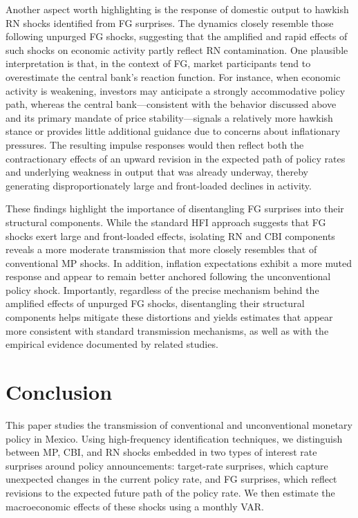 \documentclass[12pt, reqno]{article}
\begin{document}
Another aspect worth highlighting is the response of domestic output to hawkish RN shocks identified from FG surprises. The dynamics closely resemble those following unpurged FG shocks, suggesting that the amplified and rapid effects of such shocks on economic activity partly reflect RN contamination. One plausible interpretation is that, in the context of FG, market participants tend to overestimate the central bank’s reaction function. For instance, when economic activity is weakening, investors may anticipate a strongly accommodative policy path, whereas the central bank—consistent with the behavior discussed above and its primary mandate of price stability—signals a relatively more hawkish stance or provides little additional guidance due to concerns about inflationary pressures. The resulting impulse responses would then reflect both the contractionary effects of an upward revision in the expected path of policy rates and underlying weakness in output that was already underway, thereby generating disproportionately large and front-loaded declines in activity.


These findings highlight the importance of disentangling FG surprises into their structural components. While the standard HFI approach suggests that FG shocks exert large and front-loaded effects, isolating RN and CBI components reveals a more moderate transmission that more closely resembles that of conventional MP shocks. In addition, inflation expectations exhibit a more muted response and appear to remain better anchored following the unconventional policy shock. Importantly, regardless of the precise mechanism behind the amplified effects of unpurged FG shocks, disentangling their structural components helps mitigate these distortions and yields estimates that appear more consistent with standard transmission mechanisms, as well as with the empirical evidence documented by related studies.

\section{Conclusion}
\hypertarget{Section 6}{}

This paper studies the transmission of conventional and unconventional monetary policy in Mexico. Using high-frequency identification techniques, we distinguish between MP, CBI, and RN shocks embedded in two types of interest rate surprises around policy announcements: target-rate surprises, which capture unexpected changes in the current policy rate, and FG surprises, which reflect revisions to the expected future path of the policy rate. We then estimate the macroeconomic effects of these shocks using a monthly VAR.
\end{document}
